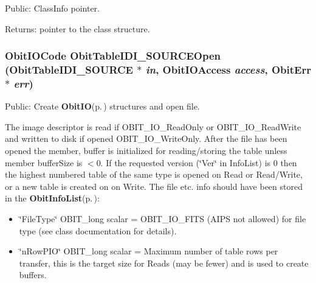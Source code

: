 Public: Class\-Info pointer. 

\begin{Desc}
\item[Returns:]pointer to the class structure. \end{Desc}
\subsubsection{\setlength{\rightskip}{0pt plus 5cm}Obit\-IOCode Obit\-Table\-IDI\_\-SOURCEOpen ({\bf Obit\-Table\-IDI\_\-SOURCE} $\ast$ {\em in}, Obit\-IOAccess {\em access}, {\bf Obit\-Err} $\ast$ {\em err})}\label{ObitTableIDI__SOURCE_8h_a17}


Public: Create {\bf Obit\-IO}{\rm (p.\,\pageref{structObitIO})} structures and open file. 

The image descriptor is read if OBIT\_\-IO\_\-Read\-Only or OBIT\_\-IO\_\-Read\-Write and written to disk if opened OBIT\_\-IO\_\-Write\-Only. After the file has been opened the member, buffer is initialized for reading/storing the table unless member buffer\-Size is $<$0. If the requested version (\char`\"{}Ver\char`\"{} in Info\-List) is 0 then the highest numbered table of the same type is opened on Read or Read/Write, or a new table is created on on Write. The file etc. info should have been stored in the {\bf Obit\-Info\-List}{\rm (p.\,\pageref{structObitInfoList})}: \begin{itemize}
\item \char`\"{}File\-Type\char`\"{} OBIT\_\-long scalar = OBIT\_\-IO\_\-FITS (AIPS not allowed) for file type (see class documentation for details). \item \char`\"{}n\-Row\-PIO\char`\"{} OBIT\_\-long scalar = Maximum number of table rows per transfer, this is the target size for Reads (may be fewer) and is used to create buffers. 
\end{itemize}
